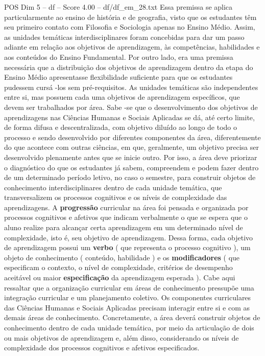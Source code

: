 \begin{textsample}{POS Dim 5 – df – Score 4.00 – df/df\_em\_28.txt}
Essa premissa se aplica particularmente ao ensino de história e de geografia, visto que os estudantes têm seu primeiro contato com Filosofia e Sociologia apenas no Ensino Médio.
Assim, as unidades temáticas interdisciplinares foram concebidas para dar um passo adiante em relação aos objetivos de aprendizagem, às competências, habilidades e aos conteúdos do Ensino Fundamental.
Por outro lado, era uma premissa necessária que a distribuição dos objetivos de aprendizagem dentro da etapa do Ensino Médio apresentasse flexibilidade suficiente para que os estudantes pudessem cursá -los sem pré-requisitos.
As unidades temáticas são independentes entre si, mas possuem cada uma objetivos de aprendizagem específicos, que devem ser trabalhados por área.
Sabe -se que o desenvolvimento dos objetivos de aprendizagens nas Ciências Humanas e Sociais Aplicadas se dá, até certo limite, de forma difusa e descentralizada, com objetivo diluído ao longo de todo o processo e sendo desenvolvido por diferentes componentes da área, diferentemente do que acontece com outras ciências, em que, geralmente, um objetivo precisa ser desenvolvido plenamente antes que se inicie outro.
Por isso, a área deve priorizar o diagnóstico do que os estudantes já sabem, compreendem e podem fazer dentro de um determinado período letivo, no caso o semestre, para construir objetos de conhecimento interdisciplinares dentro de cada unidade temática, que transversalizem os processos cognitivos e os níveis de complexidade das aprendizagens.
A \textbf{progressão} curricular na área foi pensada e organizada por processos cognitivos e afetivos que indicam verbalmente o que se espera que o aluno realize para alcançar certa aprendizagem em um determinado nível de complexidade, isto é, seu objetivo de aprendizagem.
Dessa forma, cada objetivo de aprendizagem possui um \textbf{verbo} ( que representa o processo cognitivo ), um objeto de conhecimento ( conteúdo, habilidade ) e os \textbf{modificadores} ( que especificam o contexto, o nível de complexidade, critérios de desempenho aceitável ou maior \textbf{especificação} da aprendizagem esperada ).
Cabe aqui ressaltar que a organização curricular em áreas de conhecimento pressupõe uma integração curricular e um planejamento coletivo.
Os componentes curriculares das Ciências Humanas e Sociais Aplicadas precisam interagir entre si e com as demais áreas de conhecimento.
Concretamente, a área deverá construir objetos de conhecimento dentro de cada unidade temática, por meio da articulação de dois ou mais objetivos de aprendizagem e, além disso, considerando os níveis de complexidade dos processos cognitivos e afetivos especificados.

\end{textsample}
